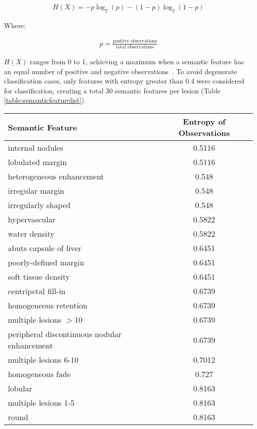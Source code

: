 \begin{align}
H(X) = -p\log_2(p) - (1-p)\log_2(1-p)
\end{align}

Where:

\begin{align}
p = \frac{\textrm{positive observations}}{\textrm{total observations}}
\end{align}

$H(X)$ ranges from 0 to 1, achieving a maximum when a semantic feature has an equal number of positive and negative observations~\cite{MacKay:2003wc}. To avoid degenerate classification cases, only features with entropy greater than 0.4 were considered for classification, creating a total 30 semantic features per lesion (Table \ref{table:semanticfeaturelist}).

\begin{table}[ht!]
	\centering
	\begin{tabular}{|l|c|}
		\hline
		Semantic Feature & Entropy of Observations \\ \hline \hline
		internal nodules & 0.5116 \\ \hline
		lobulated margin & 0.5116 \\ \hline
		heterogeneous enhancement & 0.548 \\ \hline
		irregular margin & 0.548 \\ \hline
		irregularly shaped & 0.548 \\ \hline
		hypervascular & 0.5822 \\ \hline
		water density & 0.5822 \\ \hline
		abuts capsule of liver & 0.6451 \\ \hline
		poorly-defined margin & 0.6451 \\ \hline
		soft tissue density & 0.6451 \\ \hline
		centripetal fill-in & 0.6739 \\ \hline
		homogeneous retention & 0.6739 \\ \hline
		multiple lesions $>$10 & 0.6739 \\ \hline
		peripheral discontinuous nodular enhancement & 0.6739 \\ \hline
		multiple lesions 6-10 & 0.7012 \\ \hline
		homogeneous fade & 0.727 \\ \hline
		lobular & 0.8163 \\ \hline
		multiple lesions 1-5 & 0.8163 \\ \hline
		round & 0.8163 \\ \hline

\end{tabular}
\end{table}
